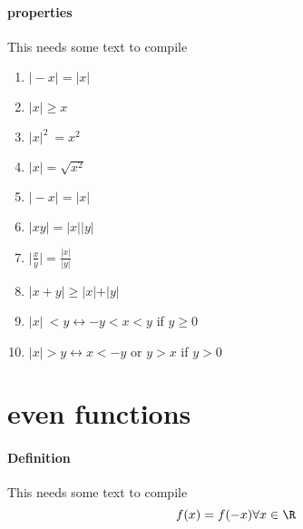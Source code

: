 \documentclass[12pt, a4paper,oneside]{book}
\begin{document}
               \paragraph{properties}
              	 \begin{paragraph}
                 This needs some text to compile
               		 \begin{enumerate}
                     	 \item{\(\vert-x\vert=\vert x \vert\)}
                         \item{\(\vert x\vert \geq x \)}
                         \item{\(\vert x\vert ^2\ =x^2\)}
                         \item{\( \vert x\vert =\sqrt{x^2}\)}
                         \item{\(\vert -x\vert =\vert x \vert \)}
                         \item{\(\vert xy \vert = \vert x \vert \vert y 								\vert \)}
                         \item {\(\vert \frac{x}{y}\vert= \frac{\vert x 								\vert } {\vert y \vert }\)}
                         \item {\(\vert x+y \vert \geq \vert x\vert 									+\vert y\vert \)} 
                         \item {\(\vert x \vert \ < y \leftrightarrow -y < 								x<y \)  if  \( y \geq 0 \)}
                         \item{\( \vert x \vert > y \leftrightarrow x<-y\) or \( y>x\) if  							\( y>0 \)}
                         \end{enumerate}
               	 \end{paragraph}
                 
          \section{ even functions} 
          
         	 \paragraph{Definition}
              \begin{paragraph}
             { This needs some text to compile
               \[f(x)=f(-x) \forall x \in \R \]}
          		\end{paragraph}
                
\end{document}
